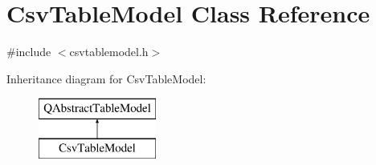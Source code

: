 \hypertarget{class_csv_table_model}{}\section{Csv\+Table\+Model Class Reference}
\label{class_csv_table_model}


{\ttfamily \#include $<$csvtablemodel.\+h$>$}

Inheritance diagram for Csv\+Table\+Model\+:\begin{figure}[H]
\begin{center}
\leavevmode
\includegraphics[height=2.000000cm]{df/d32/class_csv_table_model}
\end{center}
\end{figure}
